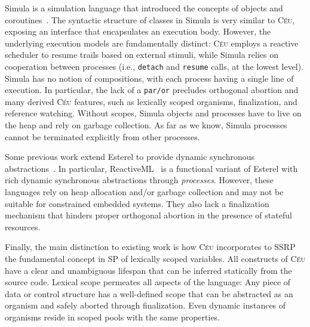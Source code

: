 \documentclass{acm_proc_article-sp}
\newcommand{\CEU}{\textsc{C\'{e}u}\xspace}
\newcommand{\code}[1] {{\small{\texttt{#1}}}}
\newcommand{\1}{\;}
\newcommand{\2}{\;\;}
\newcommand{\3}{\;\;\;}
\newcommand{\5}{\;\;\;\;\;}
\begin{document}
Simula is a simulation language that introduced the concepts of objects and 
coroutines~\cite{simula}.
%
The syntactic structure of classes in Simula is very similar to \CEU, exposing 
an interface that encapsulates an execution body.
%
However, the underlying execution models are fundamentally distinct:
\CEU employs a reactive scheduler to resume trails based on external stimuli, 
while Simula relies on cooperation between processes (i.e., \code{detach} and 
\code{resume} calls, at the lowest level).
%
Simula has no notion of compositions, with each process having a single line of 
execution.
In particular, the lack of a \code{par/or} precludes orthogonal abortion and 
many derived \CEU features, such as lexically scoped organisms, finalization, 
and reference watching.
%
Without scopes, Simula objects and processes have to live on the heap and rely 
on garbage collection.
As far as we know, Simula processes cannot be terminated explicitly from other 
processes.
%

Some previous work extend Esterel to provide dynamic synchronous 
abstractions~\cite{rp.scripts,rp.oo,sugarcubes}.
%
In particular, ReactiveML~\cite{rml} is a functional variant of Esterel with 
rich dynamic synchronous abstractions through \emph{processes}.
%
However, these languages rely on heap allocation and/or garbage collection and 
may not be suitable for constrained embedded systems.
%
%
They also lack a finalization mechanism that hinders proper orthogonal abortion 
in the presence of stateful resources.

Finally, the main distinction to existing work is how \CEU incorporates to SSRP 
the fundamental concept in SP of lexically scoped variables.
%
All constructs of \CEU have a clear and unambiguous lifespan that can be 
inferred statically from the source code.
%
Lexical scope permeates all aspects of the language:
Any piece of data or control structure has a well-defined scope that can be 
abstracted as an organism and safely aborted through finalization.
%
Even dynamic instances of organisms reside in scoped pools with the same 
properties.
%
\end{document}
